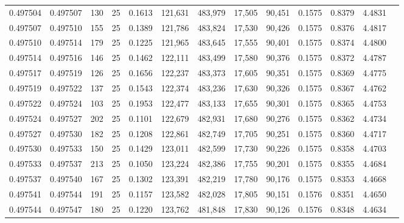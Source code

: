 \begin{tabular}{rrrrrrrrrrrrr}
0.497504 & 0.497507 & 130 &  25 &                                     0.1613 & 121,631 & 483,979 &  17,505 &  90,451 & 0.1575 & 0.8379 & 4.4831 \\
0.497507 & 0.497510 & 155 &  25 &                                     0.1389 & 121,786 & 483,824 &  17,530 &  90,426 & 0.1575 & 0.8376 & 4.4817 \\
0.497510 & 0.497514 & 179 &  25 &                                     0.1225 & 121,965 & 483,645 &  17,555 &  90,401 & 0.1575 & 0.8374 & 4.4800 \\
0.497514 & 0.497516 & 146 &  25 &                                     0.1462 & 122,111 & 483,499 &  17,580 &  90,376 & 0.1575 & 0.8372 & 4.4787 \\
0.497517 & 0.497519 & 126 &  25 &                                     0.1656 & 122,237 & 483,373 &  17,605 &  90,351 & 0.1575 & 0.8369 & 4.4775 \\
0.497519 & 0.497522 & 137 &  25 &                                     0.1543 & 122,374 & 483,236 &  17,630 &  90,326 & 0.1575 & 0.8367 & 4.4762 \\
0.497522 & 0.497524 & 103 &  25 &                                     0.1953 & 122,477 & 483,133 &  17,655 &  90,301 & 0.1575 & 0.8365 & 4.4753 \\
0.497524 & 0.497527 & 202 &  25 &                                     0.1101 & 122,679 & 482,931 &  17,680 &  90,276 & 0.1575 & 0.8362 & 4.4734 \\
0.497527 & 0.497530 & 182 &  25 &                                     0.1208 & 122,861 & 482,749 &  17,705 &  90,251 & 0.1575 & 0.8360 & 4.4717 \\
0.497530 & 0.497533 & 150 &  25 &                                     0.1429 & 123,011 & 482,599 &  17,730 &  90,226 & 0.1575 & 0.8358 & 4.4703 \\
0.497533 & 0.497537 & 213 &  25 &                                     0.1050 & 123,224 & 482,386 &  17,755 &  90,201 & 0.1575 & 0.8355 & 4.4684 \\
0.497537 & 0.497540 & 167 &  25 &                                     0.1302 & 123,391 & 482,219 &  17,780 &  90,176 & 0.1575 & 0.8353 & 4.4668 \\
0.497541 & 0.497544 & 191 &  25 &                                     0.1157 & 123,582 & 482,028 &  17,805 &  90,151 & 0.1576 & 0.8351 & 4.4650 \\
0.497544 & 0.497547 & 180 &  25 &                                     0.1220 & 123,762 & 481,848 &  17,830 &  90,126 & 0.1576 & 0.8348 & 4.4634 \\

\end{tabular}
